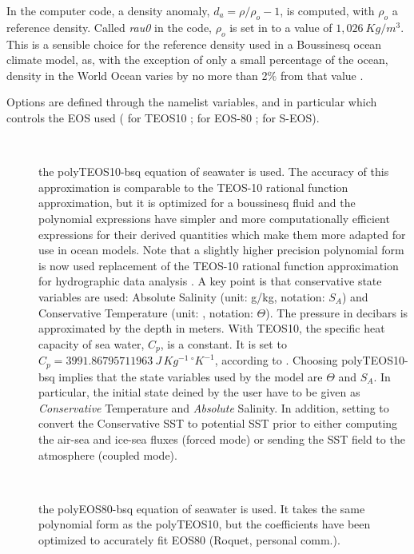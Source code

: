 \documentclass[../main/NEMO_manual]{subfiles}
\begin{document}
In the computer code, a density anomaly, $d_a = \rho / \rho_o - 1$, is computed, with $\rho_o$ a reference density.
Called \textit{rau0} in the code, $\rho_o$ is set in  to a value of $1,026~Kg/m^3$.
This is a sensible choice for the reference density used in a Boussinesq ocean climate model, as,
with the exception of only a small percentage of the ocean,
density in the World Ocean varies by no more than 2$\%$ from that value \citep{Gill1982}.

Options are defined through the  namelist variables, and in particular  which
controls the EOS used ( for TEOS10 ;  for EOS-80 ;  for S-EOS).

\begin{description}
\item[~]
  the polyTEOS10-bsq equation of seawater \citep{Roquet_OM2015} is used.
  The accuracy of this approximation is comparable to the TEOS-10 rational function approximation,
  but it is optimized for a boussinesq fluid and the polynomial expressions have simpler and
  more computationally efficient expressions for their derived quantities which make them more adapted for
  use in ocean models.
  Note that a slightly higher precision polynomial form is now used replacement of
  the TEOS-10 rational function approximation for hydrographic data analysis \citep{TEOS10}.
  A key point is that conservative state variables are used:
  Absolute Salinity (unit: g/kg, notation: $S_A$) and Conservative Temperature (unit: , notation: $\Theta$).
  The pressure in decibars is approximated by the depth in meters.
  With TEOS10, the specific heat capacity of sea water, $C_p$, is a constant.
  It is set to $C_p = 3991.86795711963~J\,Kg^{-1}\,^{\circ}K^{-1}$, according to \citet{TEOS10}.
  Choosing polyTEOS10-bsq implies that the state variables used by the model are $\Theta$ and $S_A$.
  In particular, the initial state deined by the user have to be given as \textit{Conservative} Temperature and
  \textit{Absolute} Salinity.
  In addition, setting  to  convert the Conservative SST to potential SST prior to
  either computing the air-sea and ice-sea fluxes (forced mode) or
  sending the SST field to the atmosphere (coupled mode).
\item[~]
  the polyEOS80-bsq equation of seawater is used.
  It takes the same polynomial form as the polyTEOS10, but the coefficients have been optimized to
  accurately fit EOS80 (Roquet, personal comm.).

\end{description}
\end{document}
